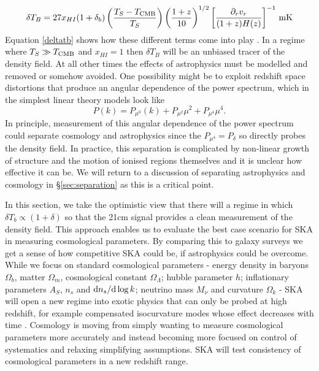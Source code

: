 \documentclass{PoS}
\newcommand{\ud}{{\rm d}}
\begin{document}
\begin{equation}\label{deltatb}
\delta T_B=27x_{HI}(1+\delta_b)\left(\frac{T_S-T_{\rm CMB}}{T_S}\right)\left(\frac{1+z}{10}\right)^{1/2}\left[\frac{\partial_rv_r}{(1+z)H(z)}\right]^{-1}{\rm\,mK}
\end{equation}
Equation \ref{deltatb} shows how these different terms come into play \citep{2006PhR...433..181F}. In a regime where $T_S\gg T_{\rm CMB}$ and $x_{HI}=1$ then $\delta T_B$ will be an unbiased tracer of the density field. At all other times the effects of astrophysics must be modelled and removed or somehow avoided. One possibility might be to exploit redshift space distortions that produce an angular dependence of the power spectrum, which in the simplest linear theory models look like
\begin{equation}
P(k)=P_{\mu^0}(k)+P_{\mu^2}\mu^2+P_{\mu^4}\mu^4.
\end{equation}
In principle, measurement of this angular dependence of the power spectrum could separate cosmology and astrophysics since the $P_{\mu^4}=P_\delta$ so directly probes the density field. In practice, this separation is complicated by non-linear growth of structure \citep{2008PhRvD..78j3512S, 2012MNRAS.422..926M} and the motion of ionised regions themselves \citep{2006ApJ...653..815M} and it is unclear how effective it can be. We will return to a discussion of separating astrophysics and cosmology in \S\ref{sec:separation} as this is a critical point. 

In this section, we take the optimistic view that there will a regime in which $\delta T_b\propto(1+\delta)$ so that the 21cm signal provides a clean measurement of the density field. This approach enables us to evaluate the best case scenario for SKA in measuring cosmological parameters. By comparing this to galaxy surveys we get a sense of how competitive SKA could be, if astrophysics could be overcome.
While we focus on standard cosmological parameters - energy density in baryons $\Omega_b$, matter $\Omega_m$, cosmological constant $\Omega_\Lambda$; hubble parameter $h$; inflationary parameters $A_S$, $n_s$ and $\ud n_s/\ud\log k$; neutrino mass $M_\nu$ and curvature $\Omega_k$ - SKA will open a new regime into exotic physics that can only be probed at high redshift, for example compensated isocurvature modes whose effect decreases with time \citep{2009PhRvD..80f3535G}. Cosmology is moving from simply wanting to measure cosmological parameters more accurately and instead becoming more focused on control of systematics and relaxing simplifying assumptions. SKA will test consistency of cosmological parameters in a new redshift range.
\end{document}
